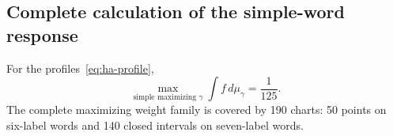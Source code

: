 \subsection{Complete calculation of the simple-word response}

\begin{proposition}\label{prop:ha-certificate}
For the profiles~\eqref{eq:ha-profile},
\begin{equation}\label{eq:ha-response}
 \max_{\text{simple maximizing }\gamma}\int f\,d\mu_\gamma=\frac1{125}.
\end{equation}
The complete maximizing weight family is covered by 190 charts: 50 points
on six-label words and 140 closed intervals on seven-label words.
\end{proposition}

